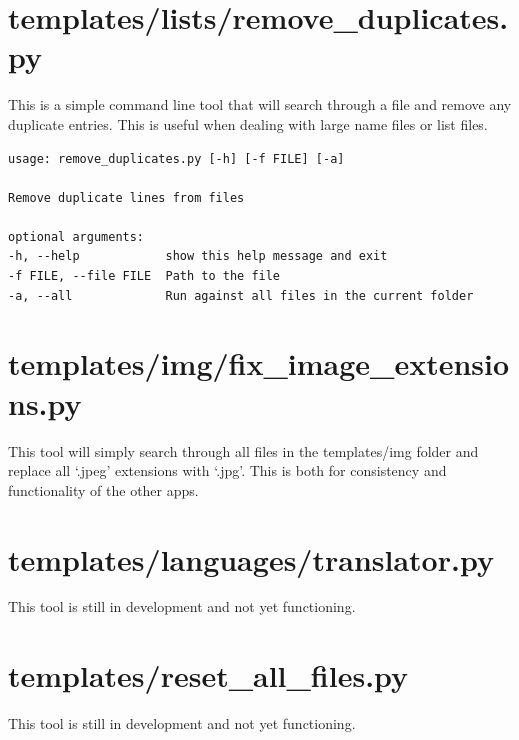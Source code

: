 \section{templates/lists/remove\_duplicates.py}

This is a simple command line tool that will search through a file and remove any duplicate entries. This is useful when dealing with large name files or list files.

\begin{lstlisting}
usage: remove_duplicates.py [-h] [-f FILE] [-a]

Remove duplicate lines from files

optional arguments:
-h, --help            show this help message and exit
-f FILE, --file FILE  Path to the file
-a, --all             Run against all files in the current folder
\end{lstlisting}














\section{templates/img/fix\_image\_extensions.py}

This tool will simply search through all files in the templates/img folder and replace all `.jpeg' extensions with `.jpg'. This is both for consistency and  functionality of the other apps.



















\section{templates/languages/translator.py}

This tool is still in development and not yet functioning.



















\section{templates/reset\_all\_files.py}

This tool is still in development and not yet functioning.



















